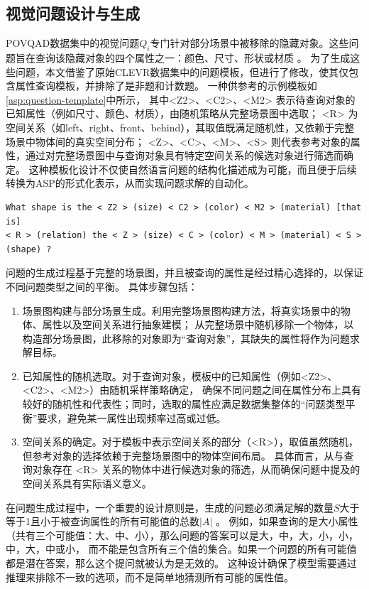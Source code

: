 \subsection{视觉问题设计与生成}
POVQAD数据集中的视觉问题$Q_i$专门针对部分场景中被移除的隐藏对象。这些问题旨在查询该隐藏对象的四个属性之一：颜色、尺寸、形状或材质 。
为了生成这些问题，本文借鉴了原始CLEVR数据集中的问题模板，但进行了修改，使其仅包含属性查询模板，并排除了是非题和计数题。
一种供参考的示例模板如\ref{asp:question-template}中所示，
其中<Z2>、<C2>、<M2> 表示待查询对象的已知属性（例如尺寸、颜色、材质），由随机策略从完整场景图中选取；
<R> 为空间关系（如left、right、front、behind），其取值既满足随机性，又依赖于完整场景中物体间的真实空间分布；
<Z>、<C>、<M>、<S> 则代表参考对象的属性，通过对完整场景图中与查询对象具有特定空间关系的候选对象进行筛选而确定。
这种模板化设计不仅使自然语言问题的结构化描述成为可能，而且便于后续转换为ASP的形式化表示，从而实现问题求解的自动化。

\begin{lstlisting}[label=asp:question-template]
What shape is the < Z2 > (size) < C2 > (color) < M2 > (material) [that is] 
< R > (relation) the < Z > (size) < C > (color) < M > (material) < S > (shape) ?
\end{lstlisting}

问题的生成过程基于完整的场景图，并且被查询的属性是经过精心选择的，以保证不同问题类型之间的平衡。
具体步骤包括：
\begin{enumerate}[itemsep=0pt,parsep=0pt]
\item 场景图构建与部分场景生成。利用完整场景图构建方法，将真实场景中的物体、属性以及空间关系进行抽象建模；
从完整场景中随机移除一个物体，以构造部分场景图，此移除的对象即为“查询对象”，其缺失的属性将作为问题求解目标。
\item 已知属性的随机选取。对于查询对象，模板中的已知属性（例如<Z2>、<C2>、<M2>）由随机采样策略确定，
确保不同问题之间在属性分布上具有较好的随机性和代表性；同时，选取的属性应满足数据集整体的“问题类型平衡”要求，避免某一属性出现频率过高或过低。
\item 空间关系的确定。对于模板中表示空间关系的部分（<R>），取值虽然随机，但参考对象的选择依赖于完整场景图中的物体空间布局。
具体而言，从与查询对象存在 <R> 关系的物体中进行候选对象的筛选，从而确保问题中提及的空间关系具有实际语义意义。
\end{enumerate}

在问题生成过程中，一个重要的设计原则是，生成的问题必须满足解的数量$S$大于等于1且小于被查询属性的所有可能值的总数$|A|$ 。
例如，如果查询的是大小属性（共有三个可能值：大、中、小），那么问题的答案可以是{大，中}，{大，小}，{小，中}，{大}，{中}或{小}，
而不能是包含所有三个值的集合。如果一个问题的所有可能值都是潜在答案，那么这个提问就被认为是无效的。
这种设计确保了模型需要通过推理来排除不一致的选项，而不是简单地猜测所有可能的属性值。

